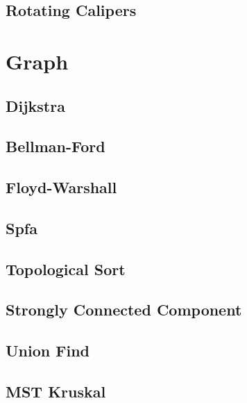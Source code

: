 \documentclass[10pt,landscape,a4paper,twocolumn]{article}
\begin{document}
\subsection{Rotating Calipers}


\section{Graph}

\subsection{Dijkstra}


\subsection{Bellman-Ford}


\subsection{Floyd-Warshall}


\subsection{Spfa}


\subsection{Topological Sort}


\subsection{Strongly Connected Component}


\subsection{Union Find}


\subsection{MST Kruskal}

\end{document}
